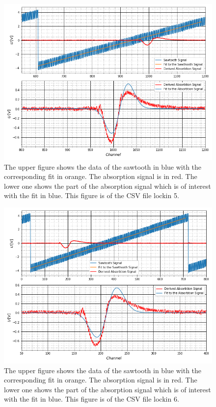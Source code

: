 	\begin{figure}[h]
		\includegraphics[scale=0.5]{Bild/LockIn5.png}
		\centering
		\caption[Plots and Fits of Lock-In Method 5]{\small The upper figure shows the data of the sawtooth in blue with the corresponding fit in orange. The absorption signal is in red. The lower one shows the part of the absorption signal which is of interest with the fit in blue. This figure is of the CSV file lockin 5.}
		\label{Lock5}
	\end{figure}
	\begin{figure}[h]
		\includegraphics[scale=0.5]{Bild/LockIn6.png}
		\centering
		\caption[Plots and Fits of Lock-In Method 6]{\small The upper figure shows the data of the sawtooth in blue with the corresponding fit in orange. The absorption signal is in red. The lower one shows the part of the absorption signal which is of interest with the fit in blue. This figure is of the CSV file lockin 6.}
		\label{Lock6}
	\end{figure}
